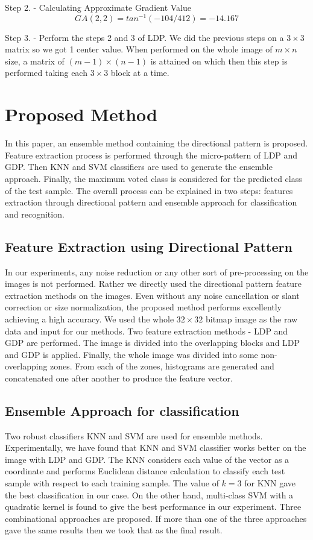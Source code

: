 \documentclass[conference]{IEEEtran}
\begin{document}
Step 2. - Calculating Approximate Gradient Value\\
\[
	GA (2,2) = tan^{-1}(-104/412) = -14.167
\]

Step 3. - Perform the steps 2 and 3 of LDP. We did the previous steps on a $3 \times 3$ matrix so we got 1 center value. When performed on the whole image of $m \times n$ size, a matrix of $(m-1) \times (n-1)$ is attained on which then this step is performed taking each $3 \times 3$ block at a time.


\section{Proposed Method}
In this paper, an ensemble method containing the directional pattern is proposed. Feature extraction process is performed through the micro-pattern of LDP and GDP. Then KNN and SVM classifiers are used to generate the ensemble approach. Finally, the maximum voted class is considered for the predicted class of the test sample. The overall process can be explained in two steps: features extraction through directional pattern and ensemble approach for classification and recognition.

\subsection{Feature Extraction using Directional Pattern}
In our experiments, any noise reduction or any other sort of pre-processing on the images is not performed. Rather we directly used the directional pattern feature extraction methods on the images. Even without any noise cancellation or slant correction or size normalization, the proposed method performs excellently achieving a high accuracy. We used the whole $32\times32$ bitmap image as the raw data and input for our methods. Two feature extraction methods - LDP and GDP are performed. The image is divided into the overlapping blocks and LDP and GDP is applied. Finally, the whole image was divided into some non-overlapping zones. From each of the zones, histograms are generated and concatenated one after another to produce the feature vector. 

\subsection{Ensemble Approach for classification}
Two robust classifiers KNN \cite{1967KNN} and SVM \cite{1995SVM} are used for ensemble methods. Experimentally, we have found that KNN and SVM classifier works better on the image with LDP and GDP. The KNN considers each value of the vector as a coordinate and performs Euclidean distance calculation to classify each test sample with respect to each training sample. The value of $k = 3$ for KNN gave the best classification in our case. On the other hand, multi-class SVM with a quadratic kernel is found to give the best performance in our experiment. Three combinational approaches are proposed. If more than one of the three approaches gave the same results then we took that as the final result.
\end{document}

